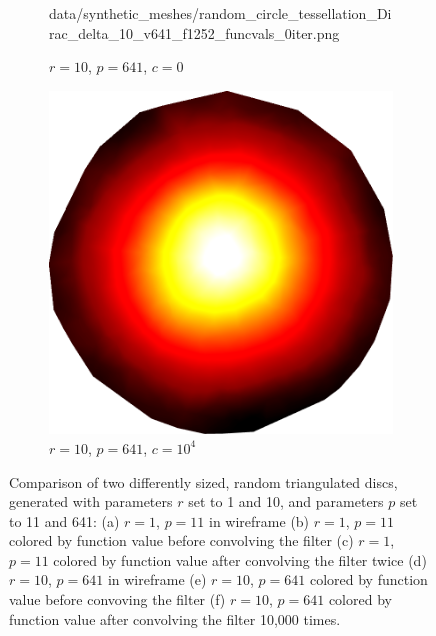 \begin{figure}[ht]
\begin{subfigure}[b]{0.32\linewidth}
		{data/synthetic_meshes/random_circle_tessellation_Dirac_delta_10_v641_f1252_funcvals_0iter.png}
		\caption{$r=10$, $p=641$, $c=0$}\label{fig:rcirc.d}
	\end{subfigure}
	\begin{subfigure}[b]{0.32\linewidth}
		\includegraphics[width=\linewidth]
		{data/synthetic_meshes/random_circle_tessellation_Dirac_delta_10_v641_f1252_funcvals_10000iter.png}
		\caption{$r=10$, $p=641$, $c=10^4$}\label{fig:rcirc.f}
	\end{subfigure}
	\caption[Six Views Comparing Random Triangulated Discs]{Comparison of two differently sized, random triangulated discs, generated with parameters $r$ set to 1 and 10, and parameters $p$ set to 11 and 641: (a) $r=1$, $p=11$ in wireframe (b) $r=1$, $p=11$ colored by function value before convolving the filter (c) $r=1$, $p=11$ colored by function value after convolving the filter twice (d) $r=10$, $p=641$ in wireframe (e) $r=10$, $p=641$ colored by function value before convoving the filter (f) $r=10$, $p=641$ colored by function value after convolving the filter 10,000 times.}
	\label{fig:rdisc}
\end{figure}

